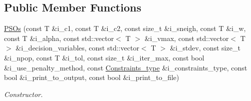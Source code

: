 \subsection*{Public Member Functions}
\begin{DoxyCompactItemize}
\item 
\hyperlink{structea_1_1_p_s_os_ae9c6e48cd827aadb4463101211baaa16}{P\+S\+Os} (const T \&i\+\_\+c1, const T \&i\+\_\+c2, const size\+\_\+t \&i\+\_\+sneigh, const T \&i\+\_\+w, const T \&i\+\_\+alpha, const std\+::vector$<$ T $>$ \&i\+\_\+vmax, const std\+::vector$<$ T $>$ \&i\+\_\+decision\+\_\+variables, const std\+::vector$<$ T $>$ \&i\+\_\+stdev, const size\+\_\+t \&i\+\_\+npop, const T \&i\+\_\+tol, const size\+\_\+t \&i\+\_\+iter\+\_\+max, const bool \&i\+\_\+use\+\_\+penalty\+\_\+method, const \hyperlink{namespaceutilities_ab1a1517bf6e62a1acfab5293ca8985c1}{Constraints\+\_\+type} \&i\+\_\+constraints\+\_\+type, const bool \&i\+\_\+print\+\_\+to\+\_\+output, const bool \&i\+\_\+print\+\_\+to\+\_\+file)
\begin{DoxyCompactList}\small\item\em Constructor. \end{DoxyCompactList}\end{DoxyCompactItemize}
